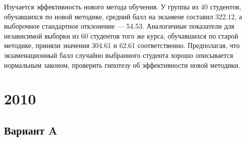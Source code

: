 \documentclass[addpoints, answers]{exam} %
\begin{document}
\begin{questions}
\question Изучается эффективность нового метода обучения. У группы из 40 студентов, обучавшихся по новой методике, средний балл на экзамене составил 322.12, а выборочное стандартное отклонение --- 54.53. Аналогичные показатели для независимой выборки из 60 студентов того же курса, обучавшихся по старой методике, приняли значения 304.61 и 62.61 соответственно. Предполагая, что экзаменационный балл случайно выбранного студента хорошо описывается нормальным законом, проверить гипотезу об эффективности новой методики.
\end{questions}
\newpage
\section{2010}
\subsection{Вариант A}
\end{document}
